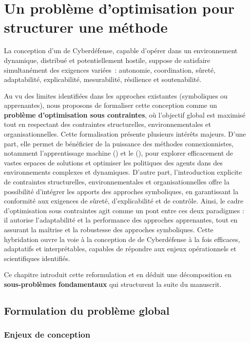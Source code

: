 \clearpage
\thispagestyle{empty}
\null
\newpage

\chapter{Un problème d'optimisation pour structurer une méthode}
\label{chap:hypotheses}

La conception d'un  de Cyberdéfense, capable d'opérer dans un environnement dynamique, distribué et potentiellement hostile, suppose de satisfaire simultanément des exigences variées~: autonomie, coordination, sûreté, adaptabilité, explicabilité, mesurabilité, résilience et soutenabilité.

Au vu des limites identifiées dans les approches existantes (symboliques ou apprenantes), nous proposons de formaliser cette conception comme un \textbf{problème d'optimisation sous contraintes}, où l'objectif global est maximisé tout en respectant des contraintes structurelles, environnementales et organisationnelles.
Cette formalisation présente plusieurs intérêts majeurs. D'une part, elle permet de bénéficier de la puissance des méthodes connexionnistes, notamment l'apprentissage machine () et le  (), pour explorer efficacement de vastes espaces de solutions et optimiser les politiques des agents dans des environnements complexes et dynamiques. D'autre part, l'introduction explicite de contraintes structurelles, environnementales et organisationnelles offre la possibilité d'intégrer les apports des approches symboliques, en garantissant la conformité aux exigences de sûreté, d'explicabilité et de contrôle. Ainsi, le cadre d'optimisation sous contraintes agit comme un pont entre ces deux paradigmes : il autorise l'adaptabilité et la performance des approches apprenantes, tout en assurant la maîtrise et la robustesse des approches symboliques. Cette hybridation ouvre la voie à la conception de  de Cyberdéfense à la fois efficaces, adaptatifs et interprétables, capables de répondre aux enjeux opérationnels et scientifiques identifiés.

Ce chapitre introduit cette reformulation et en déduit une décomposition en \textbf{sous-problèmes fondamentaux} qui structurent la suite du manuscrit.

\section{Formulation du problème global}

\subsection{Enjeux de conception}

